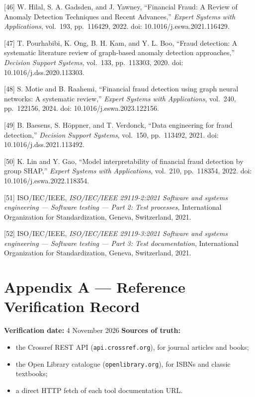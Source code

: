 \documentclass[
  12pt,
]{report}
\providecommand{\tightlist}{%
  \setlength{\itemsep}{0pt}\setlength{\parskip}{0pt}}
\begin{document}
{[}46{]} W. Hilal, S. A. Gadsden, and J. Yawney, ``Financial Fraud: A
Review of Anomaly Detection Techniques and Recent Advances,''
\emph{Expert Systems with Applications}, vol.~193, pp.~116429, 2022.
doi: 10.1016/j.eswa.2021.116429.

{[}47{]} T. Pourhabibi, K. Ong, B. H. Kam, and Y. L. Boo, ``Fraud
detection: A systematic literature review of graph-based anomaly
detection approaches,'' \emph{Decision Support Systems}, vol.~133,
pp.~113303, 2020. doi: 10.1016/j.dss.2020.113303.

{[}48{]} S. Motie and B. Raahemi, ``Financial fraud detection using
graph neural networks: A systematic review,'' \emph{Expert Systems with
Applications}, vol.~240, pp.~122156, 2024. doi:
10.1016/j.eswa.2023.122156.

{[}49{]} B. Baesens, S. Höppner, and T. Verdonck, ``Data engineering for
fraud detection,'' \emph{Decision Support Systems}, vol.~150,
pp.~113492, 2021. doi: 10.1016/j.dss.2021.113492.

{[}50{]} K. Lin and Y. Gao, ``Model interpretability of financial fraud
detection by group SHAP,'' \emph{Expert Systems with Applications},
vol.~210, pp.~118354, 2022. doi: 10.1016/j.eswa.2022.118354.

{[}51{]} ISO/IEC/IEEE, \emph{ISO/IEC/IEEE 29119-2:2021 Software and
systems engineering --- Software testing --- Part 2: Test processes},
International Organization for Standardization, Geneva, Switzerland,
2021.

{[}52{]} ISO/IEC/IEEE, \emph{ISO/IEC/IEEE 29119-3:2021 Software and
systems engineering --- Software testing --- Part 3: Test
documentation}, International Organization for Standardization, Geneva,
Switzerland, 2021.

\clearpage

\chapter{Appendix A --- Reference Verification
Record}\label{appendix-a-reference-verification-record}

\textbf{Verification date:} 4 November 2026 \textbf{Sources of truth:}

\begin{itemize}
\tightlist
\item
  the Crossref REST API (\texttt{api.crossref.org}), for journal
  articles and books;
\item
  the Open Library catalogue (\texttt{openlibrary.org}), for ISBNs and
  classic textbooks;
\item
  a direct HTTP fetch of each tool documentation URL.
\end{itemize}
\end{document}
